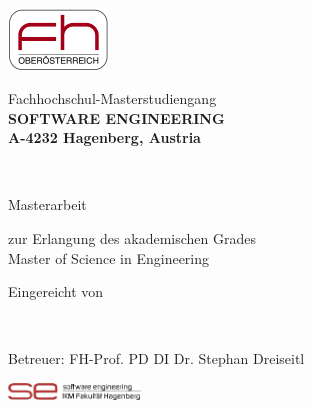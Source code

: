 \makeatletter
\begin{titlepage}
    \noindent\begin{minipage}{0.2\textwidth}
        \includegraphics[width=75pt]{img/fhooe_logo.png}
    \end{minipage}
    \noindent\begin{minipage}{0.6\textwidth}
         Fachhochschul-Masterstudiengang\\
        \bfseries SOFTWARE ENGINEERING\\
        \normalsize\mdseries A-4232 Hagenberg, Austria
    \end{minipage}

    \vspace{40mm}

    \begin{center}

    	\huge\bfseries\@title\\
    	\vspace{30mm}
    	
    	
    	\LARGE Masterarbeit\\
    	\vspace{8mm}
    	
    	\normalsize\mdseries zur Erlangung des akademischen Grades\\
    	Master of Science in Engineering\\
    	\vspace{8mm}
    	
    	Eingereicht von\\
    	\vspace{2mm}
    	
    	\Large\bfseries  \@author\\
    	\vspace{40mm}
    	
    	
    	\normalsize\mdseries Betreuer: FH-Prof. PD DI Dr. Stephan Dreiseitl \\ %
    	\vspace{3mm}
    	
    	\@date
    	
	\end{center}
	\vfill
	\noindent\includegraphics[width=100pt]{img/se_logo.png}
	\newpage
\end{titlepage}
\makeatother
